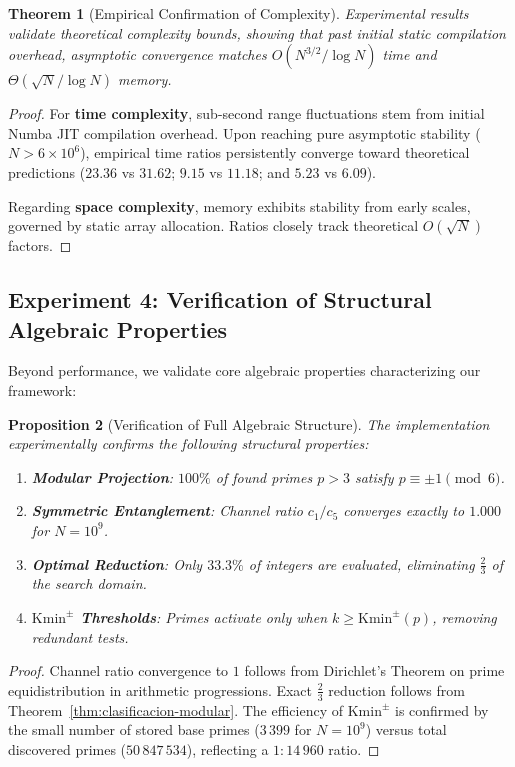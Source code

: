 \documentclass{article}
\numberwithin{equation}{section}
\theoremstyle{plain}
\newtheorem{theorem}{Theorem}[section]
\newtheorem{proposition}[theorem]{Proposition}
\theoremstyle{definition}
\begin{document}
\begin{theorem}[Empirical Confirmation of Complexity]
\label{thm:confirmacion-complejidad}
Experimental results validate theoretical complexity bounds, showing that past initial static compilation overhead, asymptotic convergence matches $O(N^{3/2}/\log N)$ time and $\Theta(\sqrt{N}/\log N)$ memory.
\end{theorem}

\begin{proof}
For \textbf{time complexity}, sub-second range fluctuations stem from initial Numba JIT compilation overhead. Upon reaching pure asymptotic stability ($N > 6\times10^6$), empirical time ratios persistently converge toward theoretical predictions ($23.36$ vs $31.62$; $9.15$ vs $11.18$; and $5.23$ vs $6.09$).

Regarding \textbf{space complexity}, memory exhibits stability from early scales, governed by static array allocation. Ratios closely track theoretical $O(\sqrt{N})$ factors.
\end{proof}

\subsection{Experiment 4: Verification of Structural Algebraic Properties}

Beyond performance, we validate core algebraic properties characterizing our framework:

\begin{proposition}[Verification of Full Algebraic Structure]
\label{prop:verificacion-algebraica}
The implementation experimentally confirms the following structural properties:
\begin{enumerate}
    \item \textbf{Modular Projection}: $100\%$ of found primes $p > 3$ satisfy $p \equiv \pm 1 \pmod{6}$.
    \item \textbf{Symmetric Entanglement}: Channel ratio $c_1/c_5$ converges exactly to $1.000$ for $N=10^9$.
    \item \textbf{Optimal Reduction}: Only $33.3\%$ of integers are evaluated, eliminating $\frac{2}{3}$ of the search domain.
    \item \textbf{$\mathrm{Kmin}^\pm$ Thresholds}: Primes activate only when $k \ge \mathrm{Kmin}^\pm(p)$, removing redundant tests.
\end{enumerate}
\end{proposition}

\begin{proof}
Channel ratio convergence to $1$ follows from Dirichlet's Theorem on prime equidistribution in arithmetic progressions. Exact $\frac{2}{3}$ reduction follows from Theorem~\ref{thm:clasificacion-modular}. The efficiency of $\mathrm{Kmin}^\pm$ is confirmed by the small number of stored base primes ($3\,399$ for $N=10^9$) versus total discovered primes ($50\,847\,534$), reflecting a $1:14\,960$ ratio.
\end{proof}
\end{document}
